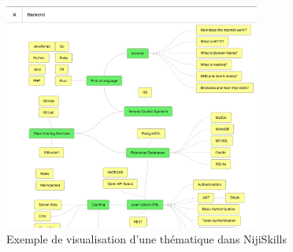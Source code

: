 \documentclass[12pt]{article}
\begin{document}
\begin{figure}[H]
  \centering
  \includegraphics[width=0.75\textwidth]{img/nijiskills-view.png}
  \caption{Exemple de visualisation d'une thématique dans NijiSkills}
\end{figure}
\end{document}
